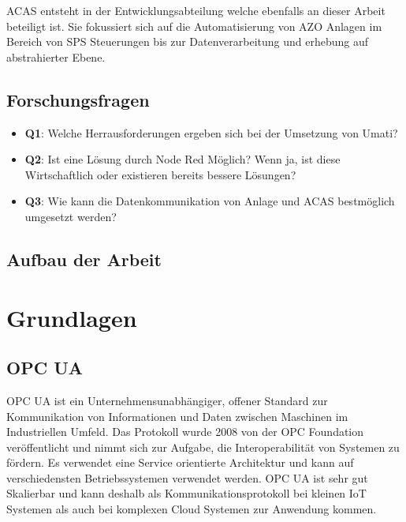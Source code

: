 \documentclass[a4paper, 12pt, oneside]{scrbook}
\begin{document}
	\noindent ACAS entsteht in der Entwicklungsabteilung welche ebenfalls an dieser Arbeit beteiligt ist. Sie fokussiert sich auf die Automatisierung von AZO Anlagen im Bereich von SPS Steuerungen bis zur Datenverarbeitung und erhebung auf abstrahierter Ebene. 
	
	
	\section{Forschungsfragen}
	
	\begin{itemize}
		\item \textbf{Q1}: Welche Herrausforderungen ergeben sich bei der Umsetzung von Umati?
		\item \textbf{Q2}: Ist eine Lösung durch Node Red Möglich? Wenn ja, ist diese Wirtschaftlich oder existieren bereits bessere Lösungen?
		\item \textbf{Q3}: Wie kann die Datenkommunikation von Anlage und ACAS bestmöglich umgesetzt werden?
	\end{itemize}
	
	\section{Aufbau der Arbeit}
	

	
\chapter{Grundlagen}
	
	\section{OPC UA}
	
	\noindent \ac{OPC UA} ist ein Unternehmensunabhängiger, offener Standard zur Kommunikation von Informationen und Daten zwischen Maschinen im Industriellen Umfeld. Das Protokoll wurde 2008 von der OPC Foundation veröffentlicht und nimmt sich zur Aufgabe, die Interoperabilität von Systemen zu fördern. Es verwendet eine Service orientierte Architektur und kann auf verschiedensten Betriebssystemen verwendet werden. OPC UA ist sehr gut Skalierbar und kann deshalb als Kommunikationsprotokoll bei kleinen \ac{IoT} Systemen als auch bei komplexen Cloud Systemen zur Anwendung kommen.
	
\end{document}
